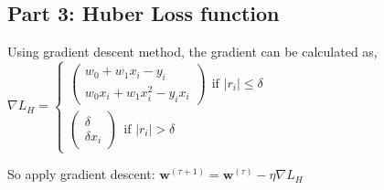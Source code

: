 \documentclass[11pt]{article}
\begin{document}
    \hypertarget{part-3-huber-loss-function}{%
\subsection{Part 3: Huber Loss
function}\label{part-3-huber-loss-function}}

Using gradient descent method, the gradient can be calculated as,
\(\nabla L_H = \begin{cases}\begin{pmatrix}w_0 + w_1x_i - y_i \\ w_0x_i + w_1x_i^2 - y_ix_i \end{pmatrix}\ \ \text{if $|r_i|\leq\delta$}\\ \begin{pmatrix}\delta\\ \delta x_i\end{pmatrix}\ \ \text{if $|r_i|>\delta$}\end{cases}\)

So apply gradient descent:
\(\mathbf{w}^{(\tau+1)} = \mathbf{w}^{(\tau)} - \eta\nabla L_H\)
\end{document}
